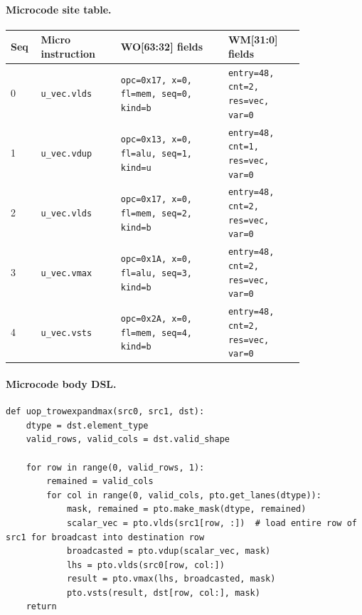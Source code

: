 \paragraph{Microcode site table.}
{\scriptsize
\begin{longtable}{@{}R{0.055\linewidth}L{0.23\linewidth}L{0.31\linewidth}L{0.22\linewidth}@{}}
\toprule
Seq & Micro instruction & WO[63:32] fields & WM[31:0] fields \\
 & \texttt{u\_vec.vlds} & \texttt{opc=0x17, x=0, fl=mem, seq=0, kind=b} & \texttt{entry=48, cnt=2, res=vec, var=0} \\
1 & \texttt{u\_vec.vdup} & \texttt{opc=0x13, x=0, fl=alu, seq=1, kind=u} & \texttt{entry=48, cnt=1, res=vec, var=0} \\
2 & \texttt{u\_vec.vlds} & \texttt{opc=0x17, x=0, fl=mem, seq=2, kind=b} & \texttt{entry=48, cnt=2, res=vec, var=0} \\
3 & \texttt{u\_vec.vmax} & \texttt{opc=0x1A, x=0, fl=alu, seq=3, kind=b} & \texttt{entry=48, cnt=2, res=vec, var=0} \\
4 & \texttt{u\_vec.vsts} & \texttt{opc=0x2A, x=0, fl=mem, seq=4, kind=b} & \texttt{entry=48, cnt=2, res=vec, var=0} \\
\bottomrule
\end{longtable}
}
\paragraph{Microcode body DSL.}
\begin{lstlisting}[style=ptocode]
def uop_trowexpandmax(src0, src1, dst):
    dtype = dst.element_type
    valid_rows, valid_cols = dst.valid_shape

    for row in range(0, valid_rows, 1):
        remained = valid_cols
        for col in range(0, valid_cols, pto.get_lanes(dtype)):
            mask, remained = pto.make_mask(dtype, remained)
            scalar_vec = pto.vlds(src1[row, :])  # load entire row of src1 for broadcast into destination row
            broadcasted = pto.vdup(scalar_vec, mask)
            lhs = pto.vlds(src0[row, col:])
            result = pto.vmax(lhs, broadcasted, mask)
            pto.vsts(result, dst[row, col:], mask)
    return
\end{lstlisting}
\Needspace{0.34\textheight}

